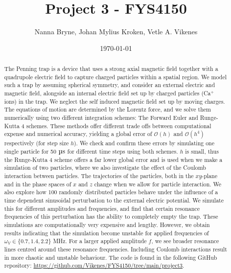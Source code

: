 



\title{Project 3 - FYS4150} 
\author{Nanna Bryne, Johan Mylius Kroken, Vetle A. Vikenes} 
\date{\today}                             
\noaffiliation                            

\begin{abstract}
    The Penning trap is a device that uses a strong axial magnetic field together with a quadrupole electric field to capture charged particles within a spatial region. We model such a trap by assuming spherical symmetry, and consider an external electric and magnetic field, alongside an internal electric field set up by charged particles (Ca$^+$ ions) in the trap. We neglect the self induced magnetic field set up by moving charges. The equations of motion are determined by the Lorentz force, and we solve them numerically using two different integration schemes: The Forward Euler and Runge-Kutta 4 schemes. These methods offer different trade offs between computational expense and numerical accuracy, yielding a global error of $\mathcal{O}(h)$ and $\mathcal{O}(h^4)$ respectively (for step size $h$). We check and confirm these errors by simulating one single particle for 50 $\mus$ for different time steps using both schemes. $h$ is small, thus the Runge-Kutta 4 scheme offers a far lower global error and is used when we make a simulation of two particles, where we also investigate the effect of the Coulomb interaction between particles. The trajectories of the particles, both in the $xy$-plane and in the phase spaces of $x$ and $z$ change when we allow for particle interaction. We also explore how 100 randomly distributed particles behave under the influence of a time dependent sinusoidal perturbation to the external electric potential. We simulate this for different amplitudes and frequencies, and find that certain resonance frequencies of this perturbation has the ability to completely empty the trap. These simulations are computationally very expensive and lengthy. However, we obtain results indicating that the simulation become unstable for applied frequencies of $\omega_V\in\{0.7,1.4, 2.2\}$ MHz. For a larger applied amplitude $f$, we see broader resonance lines centred around these resonance frequencies. Including Coulomb interactions result in more chaotic and unstable behaviour. The code is found in the following GitHub repository: \url{https://github.com/Vikenes/FYS4150/tree/main/project3}.
\end{abstract}
\maketitle














 



